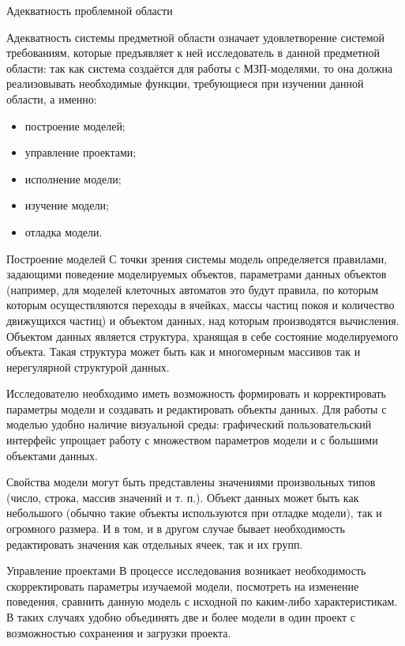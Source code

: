 \documentclass[a4paper,12pt]{extarticle}
\begin{document}
\begin{subsection}{Адекватность проблемной области}
    \label{sec:requirements-adequacy}

    Адекватность системы предметной области означает удовлетворение системой требованиям, которые предъявляет к ней исследователь в данной предметной области: так как система создаётся для работы с МЗП-моделями, то она должна реализовывать необходимые функции, требующиеся при изучении данной области, а именно:
    \begin{itemize}
        \item построение моделей;
        \item управление проектами;
        \item исполнение модели;
        \item изучение модели;
        \item отладка модели.
    \end{itemize}

    \begin{subsubsection}{Построение моделей}
        С точки зрения системы модель определяется правилами, задающими поведение моделируемых объектов, параметрами данных объектов (например, для моделей клеточных автоматов это будут правила, по которым которым осуществляются переходы в ячейках, массы частиц покоя и количество движущихся частиц) и объектом данных, над которым производятся вычисления. Объектом данных является структура, хранящая в себе состояние моделируемого объекта. Такая структура может быть как и многомерным массивов так и нерегулярной структурой данных.
        
        Исследователю необходимо иметь возможность формировать и корректировать параметры модели и создавать и редактировать объекты данных. Для работы с моделью удобно наличие визуальной среды: графический пользовательский интерфейс упрощает работу с множеством параметров модели и с большими объектами данных.
        
        Свойства модели могут быть представлены значениями произвольных типов (число, строка, массив значений и т. п.). Объект данных может быть как небольшого (обычно такие объекты используются при отладке модели), так и огромного размера. И в том, и в другом случае бывает необходимость редактировать значения как отдельных ячеек, так и их групп.
    \end{subsubsection}
        
    \begin{subsubsection}{Управление проектами}
        В процессе исследования возникает необходимость скорректировать параметры изучаемой модели, посмотреть на изменение поведения, сравнить данную модель с исходной по каким-либо характеристикам. В таких случаях удобно объединять две и более модели в один проект с возможностью сохранения и загрузки проекта. 
        

\end{subsubsection}
\end{subsection}
\end{document}
